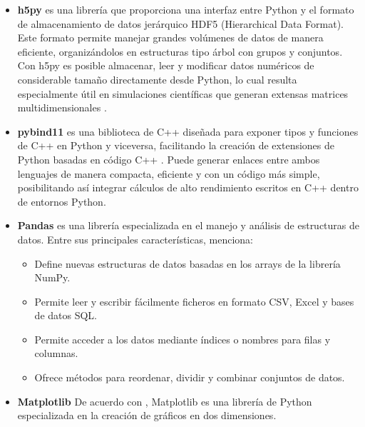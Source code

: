 \begin{itemize}
	
	
	\item \textbf{h5py} es una librería que proporciona una interfaz entre Python y el formato de almacenamiento de datos jerárquico HDF5 (Hierarchical Data Format). Este formato permite manejar grandes volúmenes de datos de manera eficiente, organizándolos en estructuras tipo árbol con grupos y conjuntos. Con h5py es posible almacenar, leer y modificar datos numéricos de considerable tamaño directamente desde Python, lo cual resulta especialmente útil en simulaciones científicas que generan extensas matrices multidimensionales \cite{h5py}.
	
	
	
	\item \textbf{pybind11} es una biblioteca de C++ diseñada para exponer tipos y funciones de C++ en Python y viceversa, facilitando la creación de extensiones de Python basadas en código C++ \cite{pybind}. Puede generar enlaces entre ambos lenguajes de manera compacta, eficiente y con un código más simple, posibilitando así integrar cálculos de alto rendimiento escritos en C++ dentro de entornos Python.
	
	
	
	\item\textbf{Pandas} es una librería especializada en el manejo y análisis de estructuras de datos. Entre sus principales características, \cite{alfaro_pandas} menciona:
	
	
	
	\begin{itemize}
		
		\item Define nuevas estructuras de datos basadas en los arrays de la librería NumPy.
		
		\item Permite leer y escribir fácilmente ficheros en formato CSV, Excel y bases de datos SQL.
		
		\item Permite acceder a los datos mediante índices o nombres para filas y columnas.
		
		\item Ofrece métodos para reordenar, dividir y combinar conjuntos de datos.
		
	\end{itemize}
	
	
	
	\item\textbf{Matplotlib} De acuerdo con \cite{alferez_matplotlib}, Matplotlib es una librería de Python especializada en la creación de gráficos en dos dimensiones.
	

\end{itemize}

